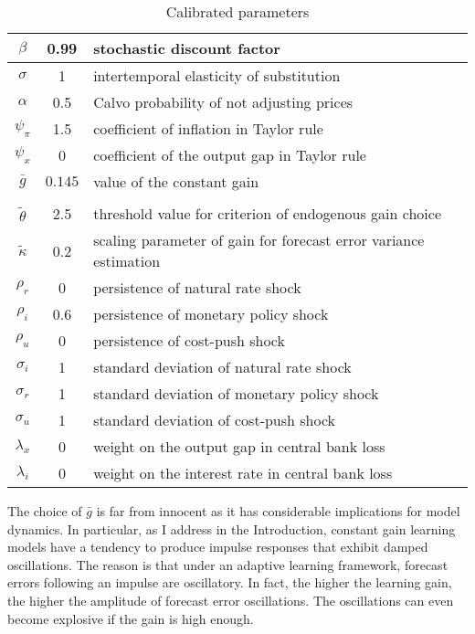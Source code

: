 \documentclass[11pt]{article}
\renewcommand{\[}{\begin{equation}}
\renewcommand{\]}{\end{equation}}
\begin{document}
\begin{center}
\begin{table}
\begin{tabular}{ c | c  | l }
 $\beta$ & 0.99 & stochastic discount factor \\  \hline
 $\sigma$ & 1  & intertemporal elasticity of substitution \\  \hline
 $\alpha$ & 0.5 &  Calvo probability of not adjusting prices \\\hline
 $\psi_{\pi} $& 1.5  & coefficient of inflation in Taylor rule \\\hline
 $\psi_x$ & 0   & coefficient of the output gap in Taylor rule  \\\hline
 $\bar{g}$ & $0.145$  & value of the constant gain \\\hline
& & \\ [-1em] %
 $\tilde{\theta}$ &  2.5  & threshold value for criterion of endogenous gain choice \\ \hline
  $\tilde{\kappa}$ &  0.2  & scaling parameter of gain for forecast error variance estimation \\ \hline
    $\rho_r$ & 0 &   persistence of natural rate shock \\ \hline
    $\rho_i$ & 0.6 &  persistence of monetary policy shock  \\ \hline
    $\rho_u$ & 0  &  persistence of cost-push shock  \\ \hline
    $\sigma_i$ & 1 & standard deviation of natural rate shock  \\ \hline
    $\sigma_r$ &  1  &standard deviation of monetary policy shock  \\ \hline
    $\sigma_u$ & 1 & standard deviation of cost-push shock   \\ \hline  
    $\lambda_x$ & 0 & weight on the output gap in central bank loss   \\ \hline  
    $\lambda_i$ & 0 & weight on the interest rate in central bank loss   \\ \hline  
\end{tabular}     
      \caption{Calibrated parameters}  \label{calibration}
 \end{table}
\end{center}

\vspace{-1.4cm}

The choice of $\bar{g}$ is far from innocent as it has considerable implications for model dynamics. In particular, as I address in the Introduction, constant gain learning models have a tendency to produce impulse responses that exhibit damped oscillations. The reason is that under an adaptive learning framework, forecast errors following an impulse are oscillatory. In fact, the higher the learning gain, the higher the amplitude of forecast error oscillations. The oscillations can even become explosive if the gain is high enough. 
\end{document}
